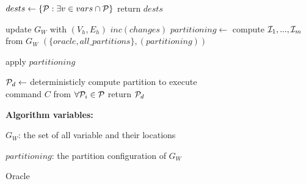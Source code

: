 \begin{algorithm}[t!]
\begin{distribalgo}[1]
\vspace{1.0mm}
	\STATE $dests \leftarrow \{ \mathcal{P} : \exists v \in vars \cap \mathcal{P} \}$
	\STATE return $dests$
\ENDINDENT

	\vspace{1.0mm}

	\STATE update $G_W$ with $(V_h,E_h)$
	\STATE $inc(changes)$
		\STATE $partitioning  \leftarrow$ compute $\mathcal{I}_1, ..., \mathcal{I}_m$ from $G_W$
		\STATE \amcast$(\{oracle, all\_partitions\}, (partitioning))$
	\ENDIF
\ENDINDENT

\vspace{1.0mm}

	\STATE apply $partitioning$
\ENDINDENT

\vspace{1.0mm}

	\STATE $\mathcal{P}_d \leftarrow$ deterministicly compute partition to execute\\ \hspace{8mm} command $C$ from $\forall \mathcal{P}_i \in \mathcal{P}$
	\STATE return $\mathcal{P}_d$
\ENDINDENT	

\vspace{1.5mm}

\textbf{Algorithm variables:}

\vspace{1mm}

$G_W$: the set of all variable and their locations

$partitioning$: the partition configuration of $G_W$


\caption{Oracle}
\label{alg:oracle_proxy}
\end{distribalgo}
\end{algorithm}



